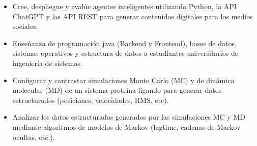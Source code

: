 \documentclass[10pt,letter,ragged2e,withhyper]{altacv}
\begin{document}
\begin{paracol}{2}

\begin{itemize}
\item Cree, despliegue y evalúe agentes inteligentes utilizando Python, la API ChatGPT y las API REST para generar contenidos digitales para los medios sociales.
\end{itemize}

\divider

\begin{itemize}
\item Enseñanza de programación java (Backend y Frontend), bases de datos, sistemas operativos y estructura de datos a estudiantes universitarios de ingeniería de sistemas.
\end{itemize}

\divider






\begin{itemize}
\item Configurar y contrastar simulaciones Monte Carlo (MC) y de dinámica molecular (MD) de un sistema proteína-ligando para generar datos estructurados (posiciones, velocidades, RMS, etc).
\item Analizar los datos estructurados generados por las simulaciones MC y MD mediante algoritmos de modelos de Markov (lagtime, cadenas de Markov ocultas, etc.).
\end{itemize}


\end{paracol}
\end{document}
